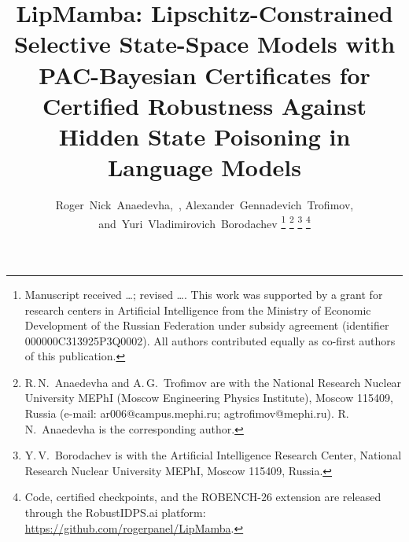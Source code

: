 \documentclass[journal,a4paper,10pt]{IEEEtran}
\theoremstyle{definition}
\theoremstyle{remark}
\newcommand{\modelname}{LipMamba}
\newcommand{\benchname}{ROBENCH-26}
\begin{document}
\title{\modelname{}: Lipschitz-Constrained Selective State-Space Models with PAC-Bayesian Certificates for Certified Robustness Against Hidden State Poisoning in Language Models}

\author{%
  Roger~Nick~Anaedevha,~,
  Alexander~Gennadevich~Trofimov,
  and~Yuri~Vladimirovich~Borodachev%
  \thanks{Manuscript received \ldots; revised \ldots. This work was supported by a grant for research centers in Artificial Intelligence from the Ministry of Economic Development of the Russian Federation under subsidy agreement (identifier 000000C313925P3Q0002). All authors contributed equally as co-first authors of this publication.}%
  \thanks{R.\,N.~Anaedevha and A.\,G.~Trofimov are with the National Research Nuclear University MEPhI (Moscow Engineering Physics Institute), Moscow 115409, Russia (e-mail: ar006@campus.mephi.ru; agtrofimov@mephi.ru). R.\,N.~Anaedevha is the corresponding author.}%
  \thanks{Y.\,V.~Borodachev is with the Artificial Intelligence Research Center, National Research Nuclear University MEPhI, Moscow 115409, Russia.}%
  \thanks{Code, certified checkpoints, and the \benchname{} extension are released through the RobustIDPS.ai platform: \url{https://github.com/rogerpanel/LipMamba}.}%
}


\maketitle
\end{document}
